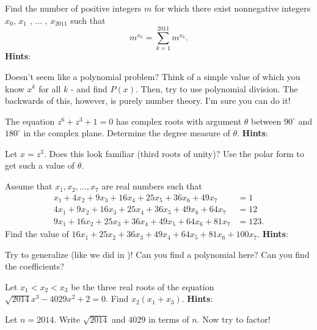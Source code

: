 \documentclass[11pt,titlepage]{scrartcl}
\newenvironment{hint}{\footnotesize \normalfont \textbf{Hints}:}{\hspace{-0.5ex}}
\begin{document}
\begin{problem}
Find the number of positive integers $m$ for which there exist nonnegative integers $x_0$, $x_1$ , $\dots$ , $x_{2011}$ such that \[m^{x_0} = \sum_{k = 1}^{2011} m^{x_k}.\]
\begin{hint}
\begin{addhint}{
Doesn't seem like a polynomial problem? Think of a simple value of which you know $x^k$ for all $k$ - and find $P(x)$. Then, try to use polynomial division. The backwards of this, however, is purely number theory. I'm sure you can do it!
}\end{addhint}
\end{hint}
\end{problem}
\begin{problem}
The equation $z^6+z^3+1=0$ has complex roots with argument $\theta$ between $90^\circ$ and $180^\circ$ in the complex plane. Determine the degree measure of $\theta$.
\begin{hint}
\begin{addhint}{
Let $x=z^3$. Does this look familiar (third roots of unity)? Use the polar form to get such a value of $\theta$.
}\end{addhint}
\end{hint}
\end{problem}
\begin{problem}
Assume that $x_1,x_2,\ldots,x_7$ are real numbers such that \begin{align*}x_1+4x_2+9x_3+16x_4+25x_5+36x_6+49x_7&=1\\ 4x_1+9x_2+16x_3+25x_4+36x_5+49x_6+64x_7&=12\\ 9x_1+16x_2+25x_3+36x_4+49x_5+64x_6+81x_7&=123.\end{align*}
Find the value of $16x_1+25x_2+36x_3+49x_4+64x_5+81x_6+100x_7$.
\begin{hint}
\begin{addhint}{
Try to generalize (like we did in )! Can you find a polynomial here? Can you find the coefficients?
}\end{addhint}
\end{hint}
\end{problem}
\begin{problem}
Let $x_1<x_2<x_3$ be the three real roots of the equation $\sqrt{2014}x^3-4029x^2+2=0$. Find $x_2(x_1+x_3)$.
\begin{hint}
\begin{addhint}{
Let $n=2014$. Write $\sqrt{2014}$ and $4029$ in terms of $n$. Now try to factor!
}\end{addhint}
\end{hint}
\end{problem}
\end{document}
